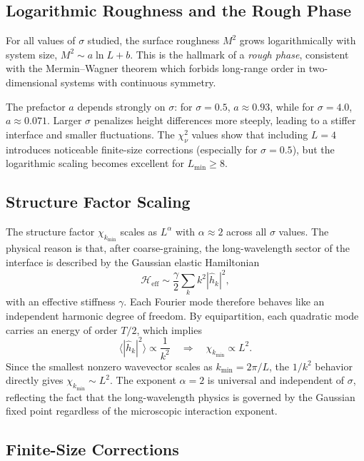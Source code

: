 \documentclass[11pt,a4paper]{article}
\begin{document}
\subsection{Logarithmic Roughness and the Rough Phase}

For all values of $\sigma$ studied, the surface roughness $M^2$ grows
logarithmically with system size, $M^2 \sim a\ln L + b$.
This is the hallmark of a \emph{rough phase}, consistent with the
Mermin--Wagner theorem which forbids long-range order in two-dimensional
systems with continuous symmetry.

The prefactor $a$ depends strongly on $\sigma$: for $\sigma=0.5$,
$a\approx 0.93$, while for $\sigma=4.0$, $a\approx 0.071$.
Larger $\sigma$ penalizes height differences more steeply, leading to a
stiffer interface and smaller fluctuations.
The $\chi^2_\nu$ values show that including $L=4$ introduces noticeable
finite-size corrections (especially for $\sigma=0.5$), but the logarithmic
scaling becomes excellent for $L_{\min}\geq 8$.

\subsection{Structure Factor Scaling}

The structure factor $\chi_{k_{\min}}$ scales as $L^{\alpha}$ with
$\alpha \approx 2$ across all $\sigma$ values.
The physical reason is that, after coarse-graining, the long-wavelength sector
of the interface is described by the Gaussian elastic Hamiltonian
\begin{equation}
  \mathcal{H}_{\mathrm{eff}} \sim \frac{\gamma}{2}\sum_k k^2 |\hat{h}_k|^2,
\end{equation}
with an effective stiffness $\gamma$. Each Fourier mode therefore behaves like
an independent harmonic degree of freedom. By equipartition, each quadratic
mode carries an energy of order $T/2$, which implies
\begin{equation}
  \langle |\hat{h}_k|^2 \rangle \propto \frac{1}{k^2}
  \quad\Rightarrow\quad
  \chi_{k_{\min}} \propto L^2.
\end{equation}
Since the smallest nonzero wavevector scales as $k_{\min}=2\pi/L$, the
$1/k^2$ behavior directly gives $\chi_{k_{\min}}\sim L^2$.
The exponent $\alpha=2$ is universal and independent of $\sigma$, reflecting
the fact that the long-wavelength physics is governed by the Gaussian fixed
point regardless of the microscopic interaction exponent.

\subsection{Finite-Size Corrections}
\end{document}
